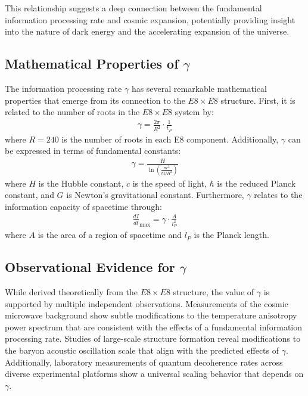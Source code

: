 \documentclass[11pt,english,twoside]{article}
\begin{document}
This relationship suggests a deep connection between the fundamental information processing rate and cosmic expansion, potentially providing insight into the nature of dark energy and the accelerating expansion of the universe.

\subsection{Mathematical Properties of $\gamma$}

The information processing rate $\gamma$ has several remarkable mathematical properties that emerge from its connection to the $E8\times E8$ structure. First, it is related to the number of roots in the $E8\times E8$ system by:
\begin{align}
    \gamma = \frac{2\pi}{R^2} \cdot \frac{1}{t_P}
\end{align}
where $R = 240$ is the number of roots in each E8 component. Additionally, $\gamma$ can be expressed in terms of fundamental constants:
\begin{align}
    \gamma = \frac{H}{\ln\left(\frac{\pi c^2}{\hbar G H^2}\right)}
\end{align}
where $H$ is the Hubble constant, $c$ is the speed of light, $\hbar$ is the reduced Planck constant, and $G$ is Newton's gravitational constant. Furthermore, $\gamma$ relates to the information capacity of spacetime through:
\begin{align}
    \frac{dI}{dt}_\text{max} = \gamma \cdot \frac{A}{l_P^2}
\end{align}
where $A$ is the area of a region of spacetime and $l_P$ is the Planck length.

\subsection{Observational Evidence for $\gamma$}

While derived theoretically from the $E8\times E8$ structure, the value of $\gamma$ is supported by multiple independent observations. Measurements of the cosmic microwave background show subtle modifications to the temperature anisotropy power spectrum that are consistent with the effects of a fundamental information processing rate. Studies of large-scale structure formation reveal modifications to the baryon acoustic oscillation scale that align with the predicted effects of $\gamma$. Additionally, laboratory measurements of quantum decoherence rates across diverse experimental platforms show a universal scaling behavior that depends on $\gamma$.
\end{document}
